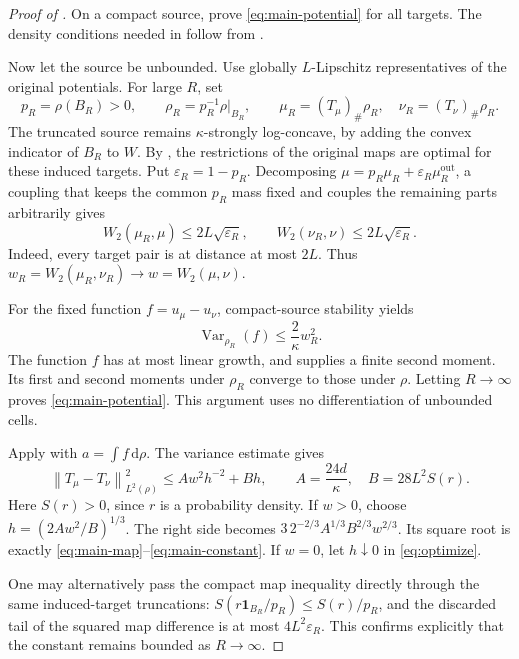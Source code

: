 \documentclass[11pt]{article}
\numberwithin{equation}{section}
\theoremstyle{remark}
\newcommand{\Var}{\operatorname{Var}}
\newcommand{\ind}{\mathbf 1}
\newcommand{\dd}{\,\mathrm d}
\newcommand{\norm}[1]{\left\lVert #1\right\rVert}
\begin{document}
\begin{proof}[Proof of ]
On a compact source,  prove \eqref{eq:main-potential} for all targets. The density conditions needed in  follow from .

Now let the source be unbounded. Use globally $L$-Lipschitz representatives of the original potentials. For large $R$, set
\[
 p_R=\rho(B_R)>0,\qquad \rho_R=p_R^{-1}\rho|_{B_R},\qquad
 \mu_R=(T_\mu)_\#\rho_R,\quad \nu_R=(T_\nu)_\#\rho_R.
\]
The truncated source remains $\kappa$-strongly log-concave, by adding the convex indicator of $B_R$ to $W$. By , the restrictions of the original maps are optimal for these induced targets. Put $\varepsilon_R=1-p_R$. Decomposing
$\mu=p_R\mu_R+\varepsilon_R\mu_R^{\mathrm{out}}$, a coupling that keeps the common $p_R$ mass fixed and couples the remaining parts arbitrarily gives
\begin{equation}\label{eq:induced-target-bound}
 W_2(\mu_R,\mu)\le2L\sqrt{\varepsilon_R},\qquad
 W_2(\nu_R,\nu)\le2L\sqrt{\varepsilon_R}.
\end{equation}
Indeed, every target pair is at distance at most $2L$. Thus $w_R=W_2(\mu_R,\nu_R)\to w=W_2(\mu,\nu)$.

For the fixed function $f=u_\mu-u_\nu$, compact-source stability yields
\[
 \Var_{\rho_R}(f)\le\frac2\kappa w_R^2.
\]
The function $f$ has at most linear growth, and  supplies a finite second moment. Its first and second moments under $\rho_R$ converge to those under $\rho$. Letting $R\to\infty$ proves \eqref{eq:main-potential}. This argument uses no differentiation of unbounded cells.

Apply  with $a=\int f\dd\rho$. The variance estimate gives
\begin{equation}\label{eq:optimize}
 \norm{T_\mu-T_\nu}_{L^2(\rho)}^2
 \le A w^2h^{-2}+Bh,
 \qquad A=\frac{24d}\kappa,\quad B=28L^2S(r).
\end{equation}
Here $S(r)>0$, since $r$ is a probability density. If $w>0$, choose
$h=(2Aw^2/B)^{1/3}$. The right side becomes
$3\,2^{-2/3}A^{1/3}B^{2/3}w^{2/3}$. Its square root is exactly \eqref{eq:main-map}--\eqref{eq:main-constant}. If $w=0$, let $h\downarrow0$ in \eqref{eq:optimize}.

One may alternatively pass the compact map inequality directly through the same induced-target truncations: $S(r\ind_{B_R}/p_R)\le S(r)/p_R$, and the discarded tail of the squared map difference is at most $4L^2\varepsilon_R$. This confirms explicitly that the constant remains bounded as $R\to\infty$.
\end{proof}
\end{document}
